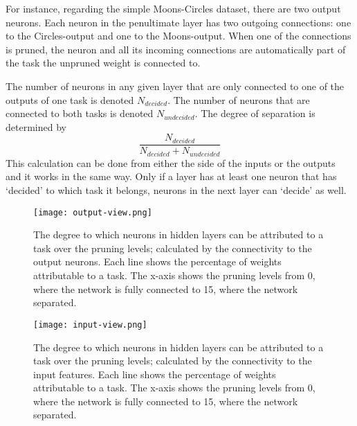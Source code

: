 For instance, regarding the simple Moons-Circles dataset, there are two output neurons.
Each neuron in the penultimate layer has two outgoing connections: one to the Circles-output and one to the Moons-output.
When one of the connections is pruned, the neuron and all its incoming connections are automatically part of the task the unpruned weight is connected to.

The number of neurons in any given layer that are only connected to one of the outputs of one task is denoted $N_{decided}$.
The number of neurons that are connected to both tasks is denoted $N_{undecided}$.
The degree of separation is determined by 
\[ \frac{N_{decided}}{N_{decided}+N_{undecided}} \]
This calculation can be done from either the side of the inputs or the outputs and it works in the same way.
Only if a layer has at least one neuron that has `decided' to which task it belongs, neurons in the next layer can `decide' as well.

\begin{figure}[ht] %
    \centering
    \texttt{[image: output-view.png]}
    \caption[Separation from the view of output neurons]{
    The degree to which neurons in hidden layers can be attributed to a task over the pruning levels; calculated by the connectivity to the output neurons.
    Each line shows the percentage of weights attributable to a task.
    The x-axis shows the pruning levels from 0, where the network is fully connected to 15, where the network separated.
    }\label{fig:outview}
\end{figure}

\begin{figure}[ht] %
    \centering
    \texttt{[image: input-view.png]}
    \caption[Separation from the view of input neurons]{
        The degree to which neurons in hidden layers can be attributed to a task over the pruning levels; calculated by the connectivity to the input features.
        Each line shows the percentage of weights attributable to a task.
        The x-axis shows the pruning levels from 0, where the network is fully connected to 15, where the network separated.
    }\label{fig:inview}
\end{figure}

